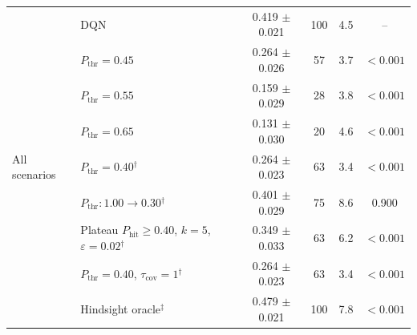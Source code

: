 \begin{table}[htbp]
\begin{tabular}{llcccc}
\midrule
\multirow{9}{*}{All scenarios} & DQN & 0.419 $\pm$ 0.021 & 100 & 4.5 & -- \\
 & $P_{\mathrm{thr}}=0.45$ & 0.264 $\pm$ 0.026 & 57 & 3.7 & $<0.001$ \\
 & $P_{\mathrm{thr}}=0.55$ & 0.159 $\pm$ 0.029 & 28 & 3.8 & $<0.001$ \\
 & $P_{\mathrm{thr}}=0.65$ & 0.131 $\pm$ 0.030 & 20 & 4.6 & $<0.001$ \\
 & $P_{\mathrm{thr}}=0.40$$^{\dagger}$ & 0.264 $\pm$ 0.023 & 63 & 3.4 & $<0.001$ \\
 & $P_{\mathrm{thr}}: 1.00 \to 0.30$$^{\dagger}$ & 0.401 $\pm$ 0.029 & 75 & 8.6 & 0.900 \\
 & Plateau $P_{\mathrm{hit}}\geq0.40$, $k=5$, $\varepsilon=0.02$$^{\dagger}$ & 0.349 $\pm$ 0.033 & 63 & 6.2 & $<0.001$ \\
 & $P_{\mathrm{thr}}=0.40$, $\tau_{\mathrm{cov}}=1$$^{\dagger}$ & 0.264 $\pm$ 0.023 & 63 & 3.4 & $<0.001$ \\
 & Hindsight oracle$^{\ddagger}$ & 0.479 $\pm$ 0.021 & 100 & 7.8 & $<0.001$ \\
\bottomrule
\end{tabular}
\end{table}
